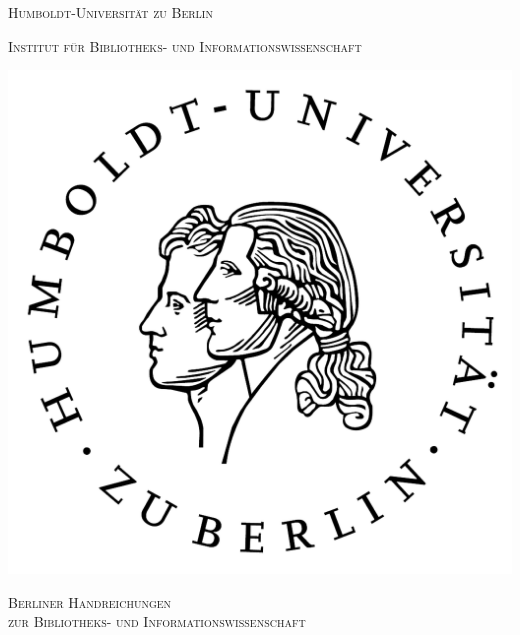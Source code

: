 %
%  
%


\begin{titlepage}
\centering

{\Huge \scshape Humboldt-Universität zu Berlin \par}
{\Large \scshape Institut für Bibliotheks- und Informationswissenschaft \par}

\vspace{2cm}

\includegraphics[scale=.7]{BHR_template/husiegel-sw.png}\\

\vspace{2cm}

{\huge \scshape Berliner Handreichungen \\zur Bibliotheks- und Informationswissenschaft \par}


\end{titlepage}
